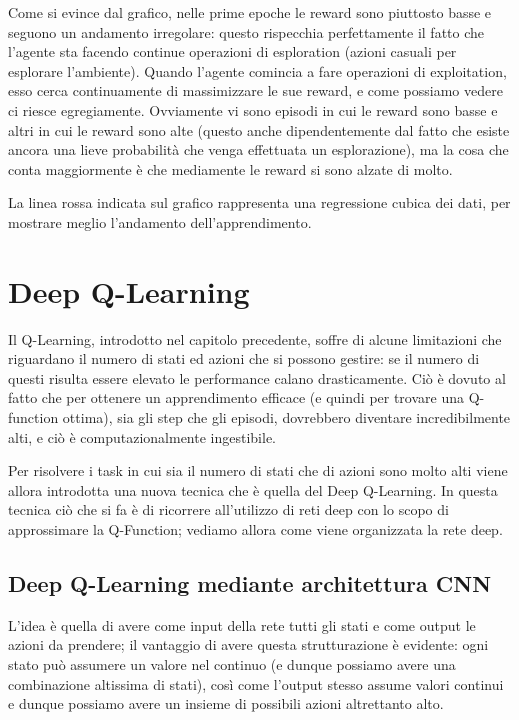 \documentclass[a4paper,11pt,twoside]{report} %
\begin{document}
Come si evince dal grafico, nelle prime epoche le reward sono piuttosto basse e seguono un andamento irregolare: questo rispecchia perfettamente il fatto che l'agente sta facendo continue operazioni di esploration (azioni casuali per esplorare l'ambiente). Quando l'agente comincia a fare operazioni di exploitation, esso cerca continuamente di massimizzare le sue reward, e come possiamo vedere ci riesce egregiamente. Ovviamente vi sono episodi in cui le reward sono basse e altri in cui le reward sono alte (questo anche dipendentemente dal fatto che esiste ancora una lieve probabilità che venga effettuata un esplorazione), ma la cosa che conta maggiormente è che mediamente le reward si sono alzate di molto.

La linea rossa indicata sul grafico rappresenta una regressione cubica dei dati, per mostrare meglio l'andamento dell'apprendimento.

\chapter{Deep Q-Learning}

Il Q-Learning, introdotto nel capitolo precedente, soffre di alcune limitazioni che riguardano il numero di stati ed azioni che si possono gestire: se il numero di questi risulta essere elevato le performance calano drasticamente. Ciò è dovuto al fatto che per ottenere un apprendimento efficace (e quindi per trovare una Q-function ottima), sia gli step che gli episodi, dovrebbero diventare incredibilmente alti, e ciò è computazionalmente ingestibile.

Per risolvere i task in cui sia il numero di stati che di azioni sono molto alti viene allora introdotta una nuova tecnica che è quella del Deep Q-Learning. In questa tecnica ciò che si fa è di ricorrere all'utilizzo di reti deep con lo scopo di approssimare la Q-Function; vediamo allora come viene organizzata la rete deep.

\section{Deep Q-Learning mediante architettura CNN}

L'idea è quella di avere come input della rete tutti gli stati e come output le azioni da prendere; il vantaggio di avere questa strutturazione è evidente: ogni stato può assumere un valore nel continuo (e dunque possiamo avere una combinazione altissima di stati), così come l'output stesso assume valori continui e dunque possiamo avere un insieme di possibili azioni altrettanto alto.
\end{document}
